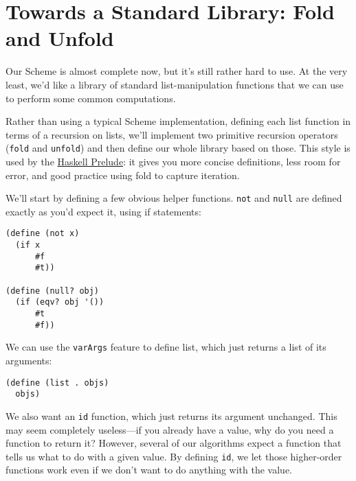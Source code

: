 \chapter[Towards a Standard Library]{Towards a Standard Library: Fold and Unfold}
 
 
\lstset{numbers=none}
 
Our Scheme is almost complete now, but it's still rather hard to use. At the very least, we'd like a library of standard list-manipulation functions that we can use to perform some common computations.
 
Rather than using a typical Scheme implementation, defining each list function in terms of a recursion on lists, we'll implement two primitive recursion operators (\verb|fold| and \verb|unfold|) and then define our whole library based on those. This style is used by the \href{http://www.haskell.org/onlinereport/standard-prelude.html}{Haskell Prelude}: it gives you more concise definitions, less room for error, and good practice using fold to capture iteration.
 
We'll start by defining a few obvious helper functions. \verb|not| and \verb|null| are defined exactly as you'd expect it, using if statements:
 
\begin{lstlisting}
(define (not x)
  (if x 
      #f
      #t))
 
(define (null? obj)
  (if (eqv? obj '())
      #t
      #f))
\end{lstlisting}
 
We can use the \verb|varArgs| feature to define list, which just returns a list of its arguments:
 
\begin{lstlisting}
(define (list . objs)
  objs)
\end{lstlisting}
 
We also want an \verb|id| function, which just returns its argument unchanged. This may seem completely useless---if you already have a value, why do you need a function to return it? However, several of our algorithms expect a function that tells us what to do with a given value. By defining \verb|id|, we let those higher-order functions work even if we don't want to do anything with the value.
 
